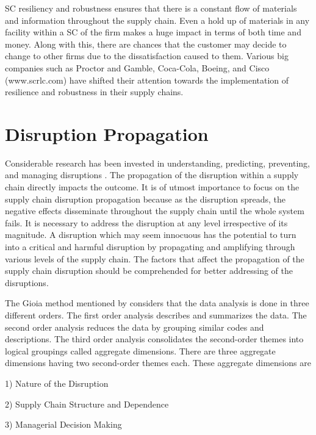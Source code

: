 SC resiliency and robustness ensures that there is a constant flow of materials and information throughout the supply chain. Even a hold up of materials in any facility within a SC of the firm makes a huge impact in terms of both time and money. Along with this, there are chances that the customer may decide to change to other firms due to the dissatisfaction caused to them. Various big companies such as Proctor and Gamble, Coca-Cola, Boeing, and Cisco (www.scrlc.com) have shifted their attention towards the implementation of resilience and robustness in their supply chains. 

\newpage
\section{Disruption Propagation}
Considerable research has been invested in understanding, predicting, preventing, and managing disruptions  \citep{Ivanov2016}. The propagation of the disruption within a supply chain directly impacts the outcome. It is of utmost importance to focus on the supply chain disruption propagation because as the disruption spreads, the negative effects disseminate throughout the supply chain until the whole system fails. It is necessary to address the disruption at any level irrespective of its magnitude. A disruption which may seem innocuous has the potential to turn into a critical and harmful disruption by propagating and amplifying through various levels of the supply chain. The factors that affect the propagation of the supply chain disruption should be comprehended for better addressing of the disruptions.

The Gioia method mentioned by \citep{Scheibe2018} considers that the data analysis is done in three different orders. The first order analysis describes and summarizes the data. The second order analysis reduces the data by grouping similar codes and descriptions. The third order analysis consolidates the second-order themes into logical groupings called aggregate dimensions. There are three aggregate dimensions having two second-order themes each. These aggregate dimensions are 

1) Nature of the Disruption

2) Supply Chain Structure and Dependence 

3) Managerial Decision Making

